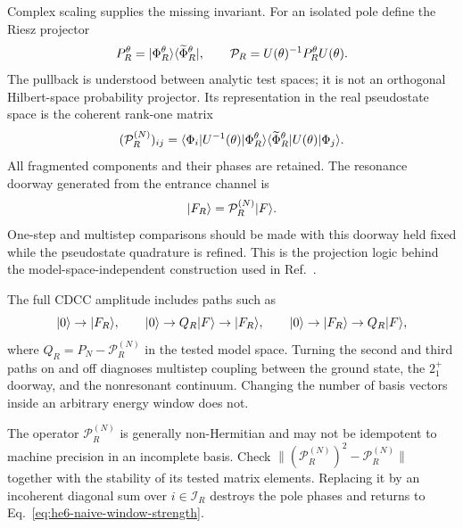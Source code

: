 Complex scaling supplies the missing invariant.  For an isolated pole define
the Riesz projector
\begin{equation}
  P_R^\theta
  =\lvert \Phi_R^\theta \rangle
   \langle \widetilde\Phi_R^\theta \rvert,
  \qquad
  \mathcal P_R=U(\theta)^{-1}P_R^\theta U(\theta).
  \label{eq:he6-resonance-projector}
\end{equation}
The pullback is understood between analytic test spaces; it is not an
orthogonal Hilbert-space probability projector.  Its representation in the
real pseudostate space is the coherent rank-one matrix
\begin{equation}
  (\mathcal P_R^{(N)})_{ij}
  =\langle \Phi_i \rvert U^{-1}(\theta)\lvert \Phi_R^\theta \rangle
   \langle \widetilde\Phi_R^\theta \rvert U(\theta)\lvert \Phi_j \rangle.
  \label{eq:he6-resonance-projector-pseudostates}
\end{equation}
All fragmented components and their phases are retained.  The resonance
doorway generated from the entrance channel is
\begin{equation}
  \lvert F_R \rangle
  =\mathcal P_R^{(N)}\lvert F \rangle.
  \label{eq:he6-resonance-doorway-source}
\end{equation}
One-step and multistep comparisons should be made with this doorway held
fixed while the pseudostate quadrature is refined.  This is the projection
logic behind the model-space-independent construction used in
Ref.~\cite{arXiv:2103.16865}.

The full CDCC amplitude includes paths such as
\begin{equation}
  \lvert 0 \rangle\to\lvert F_R \rangle,
  \qquad
  \lvert 0 \rangle\to Q_R\lvert F \rangle\to\lvert F_R \rangle,
  \qquad
  \lvert 0 \rangle\to\lvert F_R \rangle\to Q_R\lvert F \rangle,
  \label{eq:he6-multistep-paths}
\end{equation}
where $Q_R=P_N-\mathcal P_R^{(N)}$ in the tested model space.  Turning the
second and third paths on and off diagnoses multistep coupling between the
ground state, the $2_1^+$ doorway, and the nonresonant continuum.  Changing
the number of basis vectors inside an arbitrary energy window does not.

\begin{warningbox}
The operator $\mathcal P_R^{(N)}$ is generally non-Hermitian and may not be
idempotent to machine precision in an incomplete basis.  Check
$\|(\mathcal P_R^{(N)})^2-\mathcal P_R^{(N)}\|$ together with the stability
of its tested matrix elements.  Replacing it by an incoherent diagonal sum
over $i\in\mathcal I_R$ destroys the pole phases and returns to
Eq.~\eqref{eq:he6-naive-window-strength}.
\end{warningbox}

